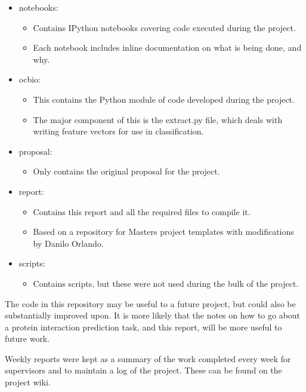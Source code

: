 \begin{itemize}
    \item notebooks:
        \begin{itemize}
            \item Contains IPython notebooks covering code executed during the project.
            \item Each notebook includes inline documentation on what is being done, and why.
        \end{itemize}
    \item ocbio:
        \begin{itemize}
            \item This contains the Python module of code developed during the project.
            \item The major component of this is the extract.py file, which deals with writing feature vectors for use in classification.
        \end{itemize}
    \item proposal:
        \begin{itemize}
            \item Only contains the original proposal for the project.
        \end{itemize}
    \item report:
        \begin{itemize}
            \item Contains this report and all the required files to compile it.
            \item Based on a repository for Masters project templates\autocite{ug4template} with modifications by Danilo Orlando.
        \end{itemize}
    \item scripts:
        \begin{itemize}
            \item Contains scripts, but these were not used during the bulk of the project.
        \end{itemize}
\end{itemize}

The code in this repository may be useful to a future project, but could also be substantially improved upon.
It is more likely that the notes on how to go about a protein interaction prediction task, and this report, will be more useful to future work.

Weekly reports were kept as a summary of the work completed every week for supervisors and to maintain a log of the project.
These can be found on the project wiki\autocite{opencastbiowiki}.

